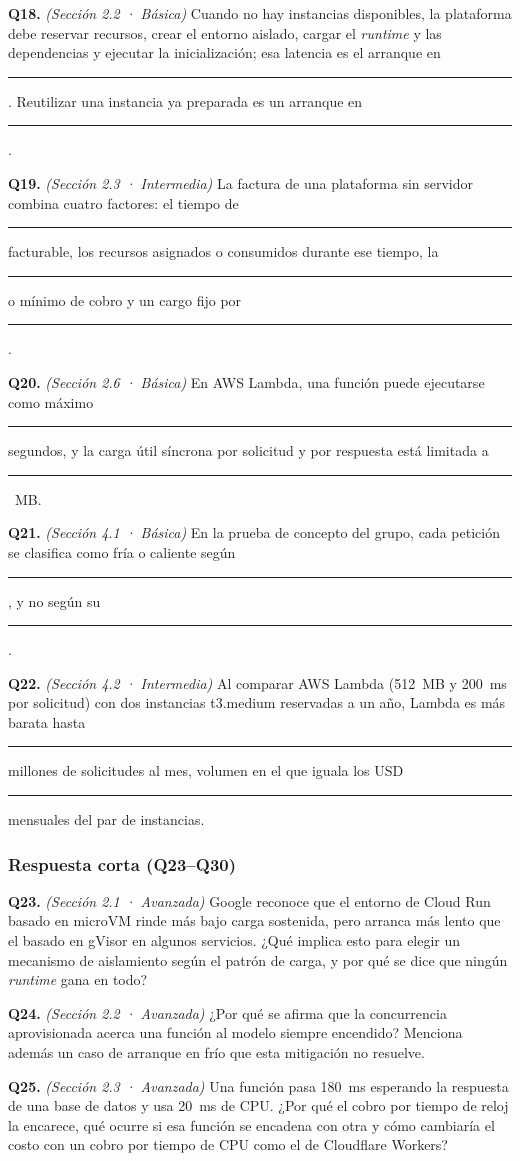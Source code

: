 \documentclass[12pt, letterpaper, table, xcdraw]{inf-pucv}
\begin{document}
\textbf{Q18.} \textit{(Sección 2.2 · Básica)} Cuando no hay instancias disponibles, la plataforma debe reservar recursos, crear el entorno aislado, cargar el \emph{runtime} y las dependencias y ejecutar la inicialización; esa latencia es el arranque en \rule{2.2cm}{0.4pt}. Reutilizar una instancia ya preparada es un arranque en \rule{2.2cm}{0.4pt}.

\textbf{Q19.} \textit{(Sección 2.3 · Intermedia)} La factura de una plataforma sin servidor combina cuatro factores: el tiempo de \rule{2.2cm}{0.4pt} facturable, los recursos asignados o consumidos durante ese tiempo, la \rule{2.2cm}{0.4pt} o mínimo de cobro y un cargo fijo por \rule{2.2cm}{0.4pt}.

\textbf{Q20.} \textit{(Sección 2.6 · Básica)} En AWS Lambda, una función puede ejecutarse como máximo \rule{2.2cm}{0.4pt} segundos, y la carga útil síncrona por solicitud y por respuesta está limitada a \rule{2.2cm}{0.4pt}~MB.

\textbf{Q21.} \textit{(Sección 4.1 · Básica)} En la prueba de concepto del grupo, cada petición se clasifica como fría o caliente según \rule{2.2cm}{0.4pt}, y no según su \rule{2.2cm}{0.4pt}.

\textbf{Q22.} \textit{(Sección 4.2 · Intermedia)} Al comparar AWS Lambda (512~MB y 200~ms por solicitud) con dos instancias t3.medium reservadas a un año, Lambda es más barata hasta \rule{2.2cm}{0.4pt} millones de solicitudes al mes, volumen en el que iguala los USD \rule{2.2cm}{0.4pt} mensuales del par de instancias.

\subsubsection*{Respuesta corta (Q23--Q30)}

\textbf{Q23.} \textit{(Sección 2.1 · Avanzada)} Google reconoce que el entorno de Cloud Run basado en microVM rinde más bajo carga sostenida, pero arranca más lento que el basado en gVisor en algunos servicios. ¿Qué implica esto para elegir un mecanismo de aislamiento según el patrón de carga, y por qué se dice que ningún \emph{runtime} gana en todo?

\textbf{Q24.} \textit{(Sección 2.2 · Avanzada)} ¿Por qué se afirma que la concurrencia aprovisionada acerca una función al modelo siempre encendido? Menciona además un caso de arranque en frío que esta mitigación no resuelve.

\textbf{Q25.} \textit{(Sección 2.3 · Avanzada)} Una función pasa 180~ms esperando la respuesta de una base de datos y usa 20~ms de CPU. ¿Por qué el cobro por tiempo de reloj la encarece, qué ocurre si esa función se encadena con otra y cómo cambiaría el costo con un cobro por tiempo de CPU como el de Cloudflare Workers?
\end{document}
